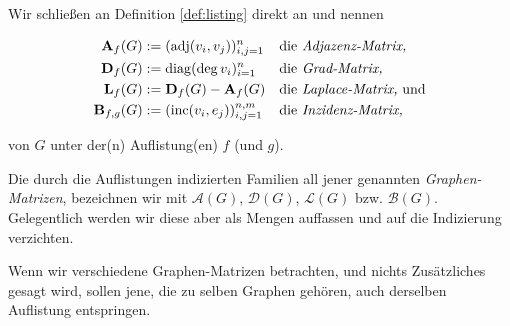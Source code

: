         \begin{definition} \label{def:graph_matrices}

            Wir schließen an Definition \ref{def:listing} direkt an und nennen

            \begin{align*}
                \mathbf A_f(G)      & := (\operatorname{adj}(v_i, v_j))_{i, j = 1}^n      & \text{die} & ~ \textit{Adjazenz-Matrix,}             \\
                \mathbf D_f(G)      & := \operatorname{diag} (\deg v_i)_{i=1}^n           & \text{die} & ~ \textit{Grad-Matrix,}                 \\
                \mathbf L_f(G)      & := \mathbf D_f(G) - \mathbf A_f(G)    & \text{die} & ~ \textit{Laplace-Matrix,} ~ \text{und} \\
                \mathbf B_{f, g}(G) & := (\operatorname{inc}(v_i, e_j))_{i, j = 1}^{n, m} & \text{die} & ~ \textit{Inzidenz-Matrix,}             \\
            \end{align*}

            von $G$ unter der(n) Auflistung(en) $f$ (und $g$).

            Die durch die Auflistungen indizierten Familien all jener genannten \textit{Graphen-Matrizen}, bezeichnen wir mit $\mathcal A(G)$, $\mathcal D(G)$, $\mathcal L(G)$ bzw. $\mathcal B(G)$.
            Gelegentlich werden wir diese aber als Mengen auffassen und auf die Indizierung verzichten.

        \end{definition}

        Wenn wir verschiedene Graphen-Matrizen betrachten, und nichts Zusätzliches gesagt wird, sollen jene, die zu selben Graphen gehören, auch derselben Auflistung entspringen.

